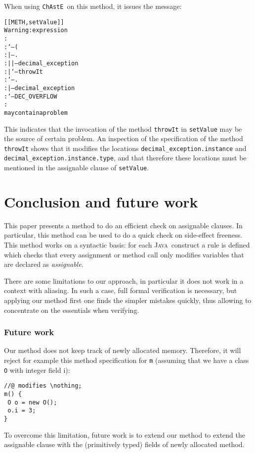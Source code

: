 \documentclass[a4paper]{llncs}
\newcommand{\java}{\textsc{Java}}
\newcommand{\modtool}{\texttt{ChAstE}}
\newcommand{\nothing}{\texttt{\(\backslash\)nothing}}
\begin{document}
When using \modtool~on this method, it issues the message$:$
\begin{alltt}
[[METH,setValue]]
Warning: expression
:
:`--(
:   |--. 
:   |  |--decimal_exception
:   |  `--throwIt
:   `--.
:      |--decimal_exception
:      `--DEC_OVERFLOW
:
may contain a problem
\end{alltt}

This indicates that the invocation of the method \texttt{throwIt} in
\texttt{setValue}
may be the source of certain problem. An inspection of the
specification of the method \texttt{throwIt} shows that it
modifies the locations \texttt{decimal\_exception.instance} and
\texttt{decimal\_exception.instance.type}, and that therefore these
locations must be mentioned in the assignable clause of
\texttt{setValue}.






\section{Conclusion and future work}
\label{sec-con-and-fut-wor}
This paper presents a method to do an efficient check on assignable
clauses. In particular, this method can be used to do a quick check on 
side-effect freeness.
This method works on a syntactic basis: 
for each \java\ construct a rule is defined which checks that every
assignment or method call only modifies variables that are declared as 
\emph{assignable}. %

There are some limitations to our approach, in particular it does not
work in a context with aliasing. In such a case, full formal
verification is necessary, but applying our method first one finds the
simpler mistakes quickly, thus allowing to concentrate on the
essentials when verifying.


\subsubsection{Future work}
Our method does not keep track of newly allocated memory. Therefore,
it will reject for example this method specification for \texttt{m}
(assuming that we have a class \texttt{O} with integer field {i}):
\begin{verbatim}
//@ modifies \nothing;
m() {
 O o = new O();
 o.i = 3;
}
\end{verbatim}
To overcome this limitation, future work is to extend our method to extend the
assignable clause with the (primitively typed) fields of newly
allocated method.
\end{document}
